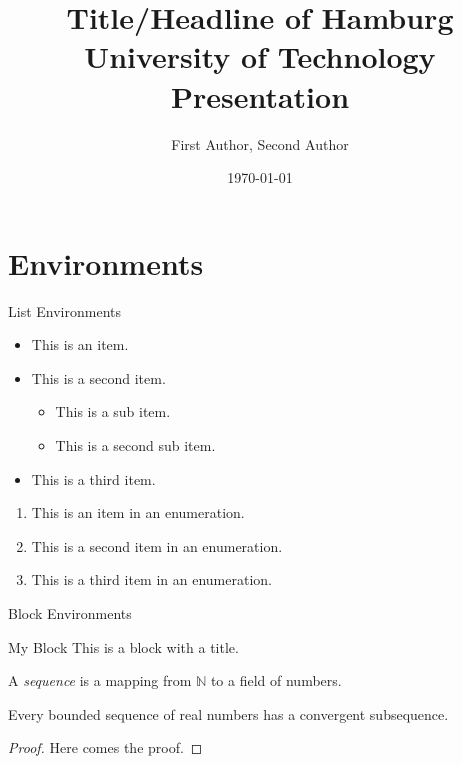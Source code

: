 \documentclass[17pt,institute=none]{tuhh_presentation}
\title{Title/Headline of Hamburg University of Technology Presentation}
\date{\today} %
\author[Corresponding Author]{First Author, Second Author}
\begin{document}
\titlepage
\agenda

\section{Environments}\label{se:environments}
\begin{frame}{List Environments}
    \begin{minipage}{0.49\textwidth}
        \begin{itemize}
            \item This is an item.
            \item This is a second item.
            \begin{itemize}
                \item This is a sub item.
                \item This is a second sub item.
            \end{itemize}
            \item This is a third item.
        \end{itemize}
    \end{minipage}
    \begin{minipage}{0.49\textwidth}
        \begin{enumerate}
            \item This is an item in an enumeration.
            \item This is a second item in an enumeration.
            \item This is a third item in an enumeration.
        \end{enumerate}
    \end{minipage}
\end{frame}

\begin{frame}{Block Environments}
    \begin{block}{My Block}
      This is a block with a title.
    \end{block}

    \begin{definition}
      A \emph{sequence} is a mapping from $\mathbb{N}$ to a field of numbers.
    \end{definition}

    \begin{theorem}
      Every bounded sequence of real numbers has a convergent subsequence.
    \end{theorem}

    \begin{proof}
      Here comes the proof.
    \end{proof}
\end{frame}
\end{document}
